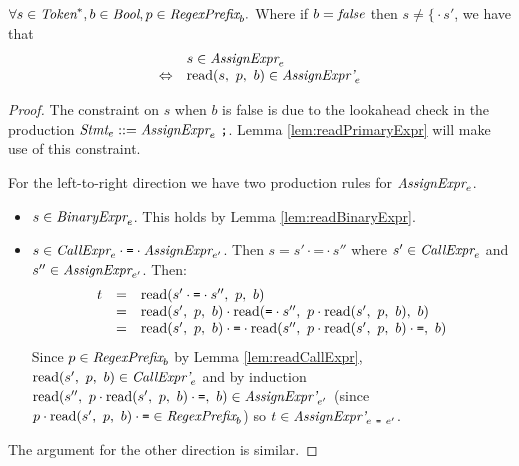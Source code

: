 \documentclass[preprint,10pt]{sigplanconf}
\begin{document}
\begin{lemma}\mbox{}
  
  \( \forall s \in \textit{Token}^*, b \in \textit{Bool}, p \in \textit{RegexPrefix}_b. \)
  Where if \( b = \textit{false} \) then \( s \not = \texttt{\{} \cdot s' \), we have that
  \[ 
  \begin{array}{rl}
  &s \in \textit{AssignExpr}_{e} 
  \\
  \Leftrightarrow&
  \textrm{read}(s,~p,~b) \in \textit{AssignExpr'}_{e} 
  \end{array}
  \]
  
\end{lemma}
\begin{proof}
  The constraint on \( s \) when \( b \) is false is due to the
  lookahead check in the production \( \textit{Stmt}_{e} ::=
  \textit{AssignExpr}_{e}~\texttt{;} \). Lemma \ref{lem:readPrimaryExpr}
  will make use of this constraint.

  For the left-to-right direction we have two production rules for
  \( \textit{AssignExpr}_{e} \).
  \begin{itemize}
  \item \( s \in \textit{BinaryExpr}_{e} \). This holds by Lemma
    \ref{lem:readBinaryExpr}.
    
  \item \( s \in \textit{CallExpr}_{e} \cdot \texttt{=} \cdot
    \textit{AssignExpr}_{e'} \).
    Then \( s = s' \cdot \texttt{=} \cdot s'' \) where \( s' \in
    \textit{CallExpr}_{e} \) and \( s'' \in
    \textit{AssignExpr}_{e'} \). Then:
    \[
    \begin{array}{rcl}
      t &=& \textrm{read}(s' \cdot \texttt{=} \cdot s'',~p,~b)
      \\
      &=& \textrm{read}(s',~p,~b)
      \cdot \textrm{read}(\texttt{=}\cdot s'',~p \cdot \textrm{read}(s',~p,~b),~b)
      \\
      &=& \textrm{read}(s',~p,~b) \cdot \texttt{=} \cdot
      \textrm{read}(s'',~p \cdot \textrm{read}(s',~p,~b) \cdot \texttt{=},~b)
    \end{array}
    \]
    Since \( p \in \textit{RegexPrefix}_b \) by Lemma
    \ref{lem:readCallExpr}, \( \textrm{read}(s',~p,~b) \in
    \textit{CallExpr'}_{e} \) and by induction \( \textrm{read}(s'',~p
      \cdot \textrm{read}(s',~p,~b) \cdot \texttt{=},~b) \in
    \textit{AssignExpr'}_{e'} \) 
    (since \( p \cdot \textrm{read}(s',~p,~b) \cdot \texttt{=} \in \textit{RegexPrefix}_b \)) so \( t \in
    \textit{AssignExpr'}_{e~\texttt{=}~e'} \).
  \end{itemize}
  
  The argument for the other direction is similar.
\end{proof}
\end{document}
